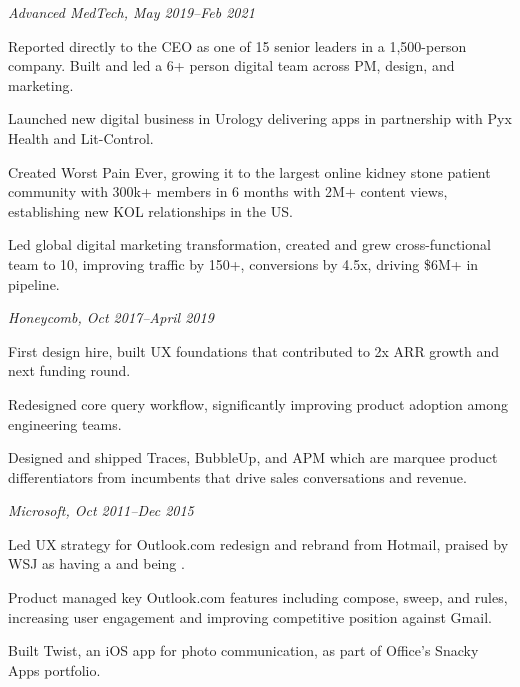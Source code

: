 \stopsectionlevel

\startsectionlevel[title={Head of Digital
Experience},reference={head-of-digital-experience}]

{\em Advanced MedTech, May 2019--Feb 2021}

\startitemize[packed]
\item
  Reported directly to the CEO as one of 15 senior leaders in a
  1,500-person company. Built and led a 6+ person digital team across
  PM, design, and marketing.
\item
  Launched new digital business in Urology delivering apps in
  partnership with Pyx Health and Lit-Control.
\item
  Created Worst Pain Ever, growing it to the largest online kidney stone
  patient community with 300k+ members in 6 months with 2M+ content
  views, establishing new KOL relationships in the US.
\item
  Led global digital marketing transformation, created and grew
  cross-functional team to 10, improving traffic by
  150+, conversions by 4.5x, driving \$6M+ in pipeline.
\stopitemize

\stopsectionlevel

\startsectionlevel[title={Product Design
Lead},reference={product-design-lead}]

{\em Honeycomb, Oct 2017--April 2019}

\startitemize[packed]
\item
  First design hire, built UX foundations that contributed to 2x ARR
  growth and next funding round.
\item
  Redesigned core query workflow, significantly improving product
  adoption among engineering teams.
\item
  Designed and shipped Traces, BubbleUp, and APM which are marquee
  product differentiators from incumbents that drive sales conversations
  and revenue.
\stopitemize

\stopsectionlevel

\startsectionlevel[title={Senior PM (Product &
UX)},reference={senior-pm-product-ux}]

{\em Microsoft, Oct 2011--Dec 2015}

\startitemize[packed]
\item
  Led UX strategy for Outlook.com redesign and rebrand from Hotmail,
  praised by WSJ as having a  and being .
\item
  Product managed key Outlook.com features including compose, sweep, and
  rules, increasing user engagement and improving competitive position
  against Gmail.
\item
  Built Twist, an iOS app for photo communication, as part of Office's
  Snacky Apps portfolio.
\stopitemize

